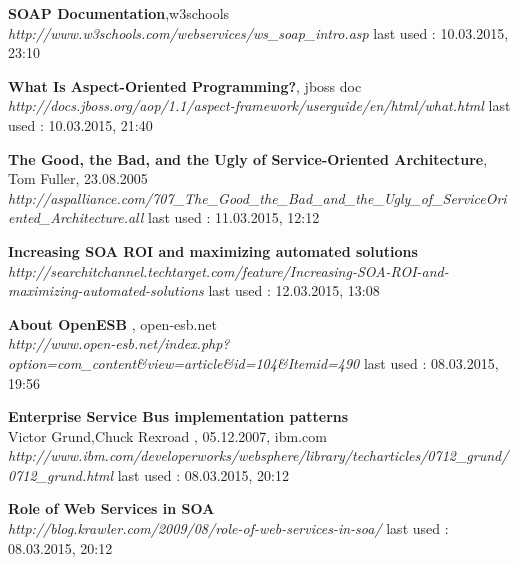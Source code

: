 \documentclass[12pt]{article}
\begin{document}
\begin{thebibliography}{56}
	\textbf{SOAP Documentation},w3schools \\
    \textit{http://www.w3schools.com/webservices/ws\_soap\_intro.asp}
    \newline last used : 10.03.2015, 23:10  
   	 
   	 
	\textbf{What Is Aspect-Oriented Programming?}, jboss doc \\
    \textit{http://docs.jboss.org/aop/1.1/aspect-framework/userguide/en/html/what.html 	 }
    \newline last used : 10.03.2015, 21:40  
   	 
	\textbf{The Good, the Bad, and the Ugly of Service-Oriented Architecture}, Tom Fuller, 23.08.2005 \\
    \textit{http://aspalliance.com/707\_The\_Good\_the\_Bad\_and\_the\_Ugly\_of\_ServiceOriented\_Architecture.all}
    \newline last used : 11.03.2015, 12:12  
 	 
  \textbf{Increasing SOA ROI and maximizing automated solutions}\\
  \textit{ 	 http://searchitchannel.techtarget.com/feature/Increasing-SOA-ROI-and-maximizing-automated-solutions}
  \newline last used : 12.03.2015, 13:08


 	 
   	  

 	     	  
   \textbf{About OpenESB }, open-esb.net\\
  \textit{http://www.open-esb.net/index.php?option=com\_content\&view=article\&id=104\&Itemid=490}
  \newline last used : 08.03.2015, 19:56 	 
   	     	     	     	     	     	     	     	  
   	     
   \textbf{Enterprise Service Bus implementation patterns} \\ Victor Grund,Chuck Rexroad , 05.12.2007, ibm.com\\
  \textit{ http://www.ibm.com/developerworks/websphere/library/techarticles/0712\_grund/0712\_grund.html}
  \newline last used : 08.03.2015, 20:12 	   	     
   	     	     	     	 
 	    	     
   \textbf{Role of Web Services in SOA} \\
  \textit{ 	 http://blog.krawler.com/2009/08/role-of-web-services-in-soa/}
  \newline last used : 08.03.2015, 20:12 	   	     
   	     	     	     	 

\end{thebibliography}
\end{document}
